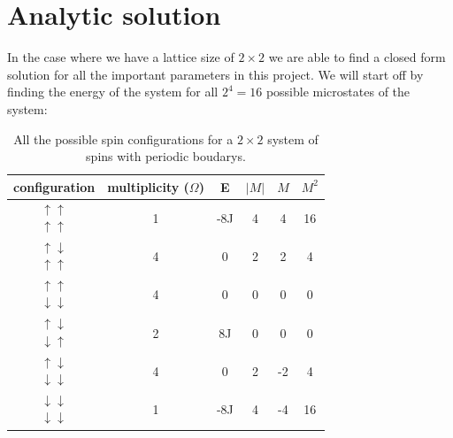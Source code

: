 \documentclass[a4paper,english, 10pt, twoside]{article}
\begin{document}
\section*{Analytic solution}
In the case where we have a lattice size of $2\times2$ we are able to find a closed form solution for all the important parameters 
in this project. We will start off by finding the energy of the system for all $2^4 = 16$ possible microstates of the system:
 
\begin{table}[H]
\centering
\begin{tabular}{|c|c|c|c|c|c|}
\hline
configuration & multiplicity ($\Omega$)& E & $|M|$ & $M$ & $M^2$\\
\hline
$\begin{matrix}\uparrow \uparrow\\ \uparrow \uparrow\end{matrix}$ & 1 & -8J & 4 & 4 & 16 \\
\hline
$\begin{matrix}\uparrow \downarrow \\ \uparrow \uparrow\end{matrix}$& 4 & 0 & 2 & 2 & 4\\
\hline
$\begin{matrix}\uparrow \uparrow \\ \downarrow \downarrow \end{matrix}$ & 4 & 0 & 0 & 0 & 0 \\
\hline
$\begin{matrix}\uparrow \downarrow  \\ \downarrow \uparrow \end{matrix}$ & 2 & 8J & 0 & 0 & 0 \\
\hline
$\begin{matrix}\uparrow \downarrow \\ \downarrow \downarrow \end{matrix}$ & 4 & 0 & 2  & -2 & 4\\
\hline
$\begin{matrix}\downarrow \downarrow  \\ \downarrow \downarrow \end{matrix}$ & 1& -8J & 4 & -4 & 16 \\

\hline
\end{tabular}
\label{table1}
\caption{All the possible spin configurations for a $2\times 2$ system of spins with periodic boudarys.}
\end{table}
\end{document}
